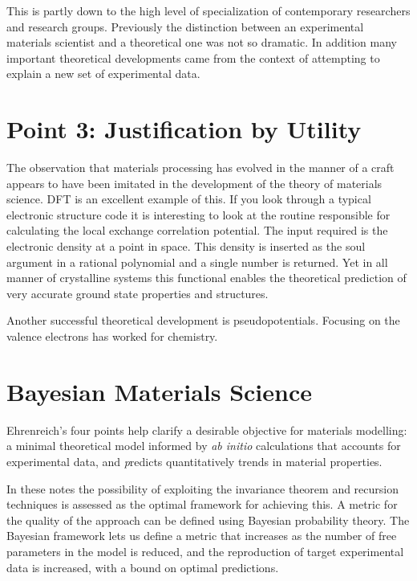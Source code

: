 This is partly down to the high level of specialization of contemporary 
researchers and research groups. Previously the distinction between
an experimental materials scientist and a theoretical one was not so dramatic. 
In addition many important theoretical developments came 
from the context of attempting to explain a new set of experimental data.


\section{Point 3: Justification by Utility}
The observation that materials processing has evolved in the manner of a craft appears to have
been imitated in the development of the theory of materials science. DFT is an excellent example of this.
If you look through a typical electronic structure code it is interesting to look at the routine
responsible for calculating the local exchange correlation potential. The input required is the 
electronic density at a point in space. This density is inserted as the soul argument in a rational polynomial
and a single number is returned. Yet in all manner of crystalline systems this functional enables the theoretical
prediction of very accurate ground state properties and structures. 

Another successful theoretical development is pseudopotentials. Focusing on the valence electrons 
has worked for chemistry.

\section{Bayesian Materials Science}
Ehrenreich's four points help clarify a desirable objective for materials modelling:
a minimal theoretical model informed by {\it ab initio} calculations that accounts for 
experimental data, and {\emph predicts} quantitatively trends in material properties. 

In these notes the possibility of exploiting the invariance theorem 
and recursion techniques is assessed as the optimal framework
for achieving this. A metric for the quality of the approach can be defined using 
Bayesian probability theory. The Bayesian framework lets us define a metric 
that increases as the number of free parameters in the model is reduced,
and the reproduction of target experimental data is increased, with a bound on optimal predictions.

